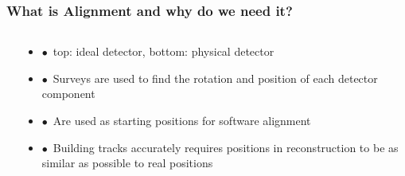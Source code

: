 \documentclass[aspectratio=1610, 12pt, xcolor=dvipsnames]{beamer}
\begin{document}
\begin{frame}\frametitle{What is Alignment and why do we need it?}
  \begin{columns}
    \begin{column}[c]{0.48\textwidth}
      
    \end{column}
    \begin{column}[c]{0.48\textwidth}
      \begin{itemize}
        \item $\bullet$\, top: ideal detector, bottom: physical detector
        \item $\bullet$\, Surveys are used to find the rotation and position of each detector component
        \item $\bullet$\, Are used as starting positions for software alignment
        \item $\bullet$\, Building tracks accurately requires positions in reconstruction to be as similar as possible to real positions
      \end{itemize}
    \end{column}
  \end{columns}
\end{frame}
\end{document}
